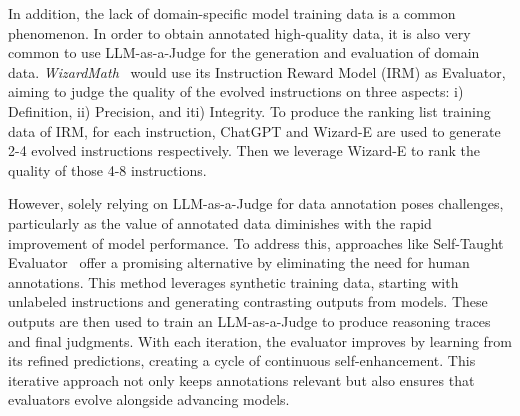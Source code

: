\documentclass[acmsmall,screen]{acmart}
\begin{document}
In addition, the lack of domain-specific model training data is a common phenomenon. In order to obtain annotated high-quality data, it is also very common to use LLM-as-a-Judge for the generation and evaluation of domain data. \textit{WizardMath}~\cite{wizardmath} would use its Instruction Reward Model (IRM) as Evaluator, aiming to judge the quality of the evolved instructions on three aspects: i) Definition, ii) Precision, and iti) Integrity. To produce the ranking list training data of IRM, for each instruction, ChatGPT and Wizard-E are used to generate 2-4 evolved instructions respectively. Then we leverage Wizard-E to rank the quality of those 4-8 instructions.


However, solely relying on LLM-as-a-Judge for data annotation poses challenges, particularly as the value of annotated data diminishes with the rapid improvement of model performance. To address this, approaches like Self-Taught Evaluator~\citep{self_taught} offer a promising alternative by eliminating the need for human annotations. This method leverages synthetic training data, starting with unlabeled instructions and generating contrasting outputs from models. These outputs are then used to train an LLM-as-a-Judge to produce reasoning traces and final judgments. With each iteration, the evaluator improves by learning from its refined predictions, creating a cycle of continuous self-enhancement. This iterative approach not only keeps annotations relevant but also ensures that evaluators evolve alongside advancing models.









\end{document}
